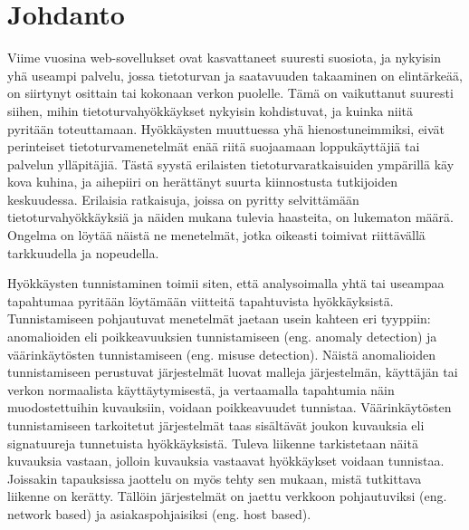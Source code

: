 
\chapter{Johdanto}

Viime vuosina web-sovellukset ovat kasvattaneet suuresti suosiota, ja nykyisin yhä useampi palvelu, jossa tietoturvan ja saatavuuden takaaminen on elintärkeää, on siirtynyt osittain tai kokonaan 
verkon puolelle. Tämä on vaikuttanut suuresti siihen, mihin tietoturvahyökkäykset nykyisin kohdistuvat, ja kuinka niitä pyritään toteuttamaan. Hyökkäysten muuttuessa yhä hienostuneimmiksi, 
eivät perinteiset tietoturvamenetelmät enää riitä suojaamaan loppukäyttäjiä tai palvelun ylläpitäjiä. Tästä syystä erilaisten tietoturvaratkaisuiden ympärillä käy kova kuhina, ja aihepiiri 
on herättänyt suurta kiinnostusta tutkijoiden keskuudessa. Erilaisia ratkaisuja, joissa on pyritty selvittämään tietoturvahyökkäyksiä ja näiden mukana tulevia haasteita, on lukematon määrä. 
Ongelma on löytää näistä ne menetelmät, jotka oikeasti toimivat riittävällä tarkkuudella ja nopeudella.  

Hyökkäysten tunnistaminen toimii siten, että analysoimalla yhtä tai useampaa tapahtumaa pyritään löytämään viitteitä tapahtuvista hyökkäyksistä. Tunnistamiseen pohjautuvat menetelmät jaetaan usein
kahteen eri tyyppiin: anomalioiden eli poikkeavuuksien tunnistamiseen (eng. anomaly detection) ja väärinkäytösten tunnistamiseen (eng. misuse detection). Näistä anomalioiden tunnistamiseen perustuvat
järjestelmät luovat malleja järjestelmän, käyttäjän tai verkon normaalista käyttäytymisestä, ja vertaamalla tapahtumia näin muodostettuihin kuvauksiin, voidaan poikkeavuudet tunnistaa. Väärinkäytösten 
tunnistamiseen tarkoitetut järjestelmät taas sisältävät joukon kuvauksia eli signatuureja tunnetuista hyökkäyksistä. Tuleva liikenne tarkistetaan näitä kuvauksia vastaan, jolloin kuvauksia vastaavat
hyökkäykset voidaan tunnistaa. Joissakin tapauksissa jaottelu on myös tehty sen mukaan, mistä tutkittava liikenne on kerätty. Tällöin järjestelmät on jaettu verkkoon pohjautuviksi (eng. network based)
ja asiakaspohjaisiksi (eng. host based). 

